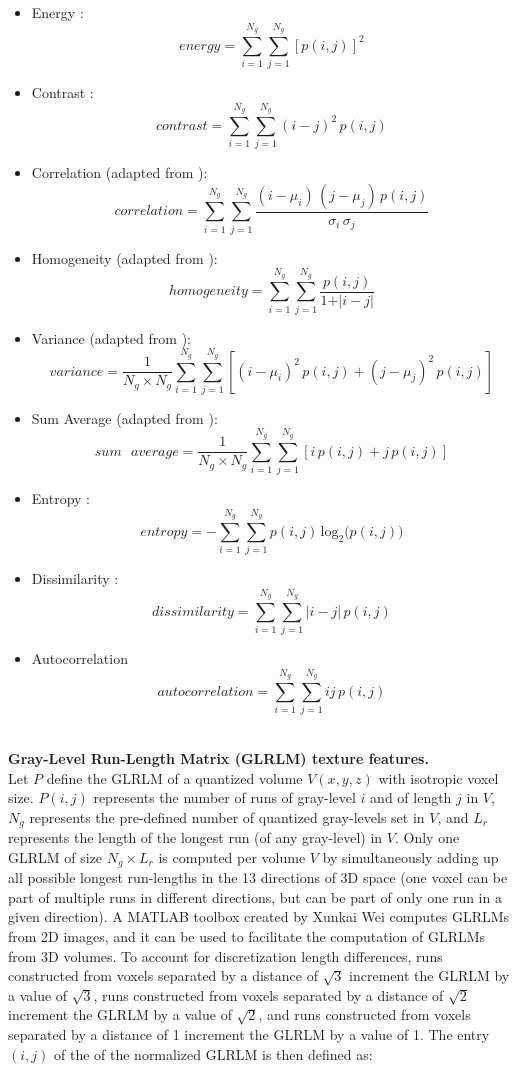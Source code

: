 \documentclass{article}
\begin{document}
\begin{itemize}
	\item Energy \cite{HaralickRM1973}:
		  \[energy = \sum_{i=1}^{N_g}\sum_{j=1}^{N_g} \left[p(i,j)\right]^2\]
	\item Contrast \cite{HaralickRM1973}:
		  \[contrast = \sum_{i=1}^{N_g}\sum_{j=1}^{N_g} (i-j)^2\,p(i,j)\]
	\item Correlation (adapted from \cite{HaralickRM1973}):
		  \[correlation = \sum_{i=1}^{N_g}\sum_{j=1}^{N_g} \frac{(i-\mu_i)\,(j-\mu_j)\,p(i,j)}	
		  {\sigma_i\,\sigma_j}\]
	\item Homogeneity (adapted from \cite{HaralickRM1973}):
		  \[homogeneity = \sum_{i=1}^{N_g}\sum_{j=1}^{N_g} \frac{p(i,j)}{1 + \vert i-j \vert}\]
	\item Variance (adapted from \cite{HaralickRM1973}):
		  \[variance = \frac{1}{N_g \times N_g} \sum_{i=1}^{N_g}\sum_{j=1}^{N_g} 
		  \left[(i-\mu_i)^2\,p(i,j) + (j-\mu_j)^2\,p(i,j)\right]\]
	\item Sum Average (adapted from \cite{HaralickRM1973}):
		  \[sum\text{ }average = \frac{1}{N_g \times N_g} \sum_{i=1}^{N_g}\sum_{j=1}^{N_g} 
		  \left[i\,p(i,j) + j\,p(i,j)\right]\]
	\item Entropy \cite{HaralickRM1973}:
		  \[entropy = -\sum_{i=1}^{N_g}\sum_{j=1}^{N_g} p(i,j)\,\text{log}_2\big(p(i,j)\big)\]
	\item Dissimilarity \cite{ThibaultG2009t}:
		  \[dissimilarity = \sum_{i=1}^{N_g}\sum_{j=1}^{N_g} \vert i-j \vert \,p(i,j)\]
	\item Autocorrelation \cite{AertsHJWL2014}
		  \[autocorrelation = \sum_{i=1}^{N_g}\sum_{j=1}^{N_g} ij \,p(i,j)\]
	\\	
\end{itemize}


\noindent \textbf{Gray-Level Run-Length Matrix (GLRLM) texture features.} \\
Let $P$ define the GLRLM of a quantized volume $V(x,y,z)$ with isotropic voxel size. $P(i,j)$ represents the number of runs of gray-level $i$ and of length $j$ in $V$, $N_g$ represents the pre-defined number of quantized gray-levels set in $V$, and $L_r$ represents the length of the longest run (of any gray-level) in $V$. Only one GLRLM of size $N_g \times L_r$ is computed per volume $V$ by simultaneously adding up all possible longest run-lengths in the 13 directions of 3D space (one voxel can be part of multiple runs in different directions, but can be part of only one run in a given direction). A MATLAB toolbox created by Xunkai Wei \cite{WeiX2008} computes GLRLMs from 2D images, and it can be used to facilitate the computation of GLRLMs from 3D volumes. To account for discretization length differences, runs constructed from voxels separated by a distance of $\sqrt{3}$ increment the GLRLM by a value of $\sqrt{3}$, runs constructed from voxels separated by a distance of $\sqrt{2}$ increment the GLRLM by a value of $\sqrt{2}$, and runs constructed from voxels separated by a distance of 1 increment the GLRLM by a value of 1. The entry $(i,j)$ of the of the normalized GLRLM is then defined as:
\end{document}
